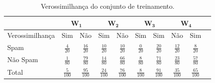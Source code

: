 \bgroup
\def\arraystretch{1.5}
\begin{table}[!htp]
\centering
\caption{Verossimilhança do conjunto de treinamento.}
\begin{tabular}{|l|c|c|c|c|c|c|c|c|c|}
\hline
\multicolumn{1}{|c|}{} & \multicolumn{2}{c|}{$\mathbf{W_1}$} & \multicolumn{2}{c|}{$\mathbf{W_2}$} & \multicolumn{2}{c|}{$\mathbf{W_3}$} & \multicolumn{2}{c|}{$\mathbf{W_4}$} \\ \hline
Verossimilhança   &   Sim &   Não   &     Sim       &      Não      &     Sim       &       Sim &      Não      &      Sim                       \\ \hline

Spam   &   \(\frac{4}{20}\) &   \(\frac{16}{20}\)   &     \(\frac{10}{20}\)       &      \(\frac{10}{20}\)      &     \(\frac{0}{20}\)       &       \(\frac{20}{20}\)     &      \(\frac{12}{20}\)      &      \(\frac{8}{20}\)                       \\ \hline

Não Spam   &   \(\frac{1}{80}\) &   \(\frac{79}{80}\)   &     \(\frac{14}{80}\)       &      \(\frac{66}{80}\)      &     \(\frac{8}{80}\)       &       \(\frac{71}{80}\)     &      \(\frac{23}{80}\)      &      \(\frac{57}{80}\)                       \\ \hline
Total  &   \(\frac{5}{100}\) &   \(\frac{95}{100}\)   &     \(\frac{24}{100}\)       &      \(\frac{76}{100}\)      &     \(\frac{8}{100}\)       &       \(\frac{91}{100}\)     &      \(\frac{35}{100}\)      &      \(\frac{65}{100}\)                       \\ \hline
\end{tabular}
\vspace{0.1cm}
	\label{tab_verossimilhancasExemploNaiveBayes}
\end{table}
\egroup

